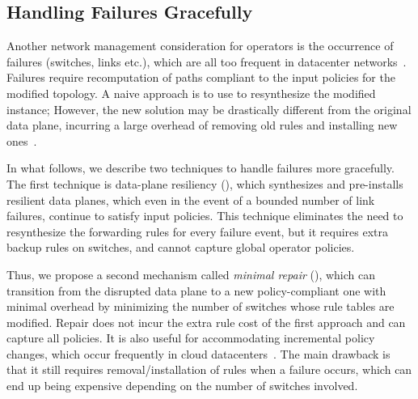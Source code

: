 \subsection{Handling Failures Gracefully}

Another network management consideration for operators is the
occurrence of failures (switches, links etc.), which are all too
frequent in datacenter networks~\cite{datacenterfailures}. Failures require
recomputation of paths compliant to the input policies
for the modified topology.  A naive approach is to use \name to
resynthesize the modified instance; However, the new solution may be
drastically different from the original data plane, incurring a large
overhead of removing old rules and installing new
ones~\cite{sdnlatency,updatescheduling}. 


In what follows, we describe two techniques to handle failures more
gracefully. The first technique is data-plane resiliency (),
which synthesizes and
pre-installs resilient data planes, which even in the event of a
bounded number of link failures, continue to satisfy input
policies. This technique eliminates the need to resynthesize the
forwarding rules for every failure event, but it 
requires extra backup rules on switches, and cannot
capture global operator policies.

Thus, we propose a second mechanism called \emph{minimal repair} (),
which can transition from the disrupted data
plane to a new policy-compliant one with minimal overhead
 by minimizing the number of
switches whose rule tables are modified. 
Repair does not incur the extra rule cost of the first approach 
and can capture all \Name policies. It is also useful for 
accommodating incremental policy changes, which occur frequently in
cloud datacenters~\cite{mpa-imc15}. The main drawback is that it still
requires removal/installation of rules when a failure occurs, which
can end up being expensive depending on the number of switches
involved.





